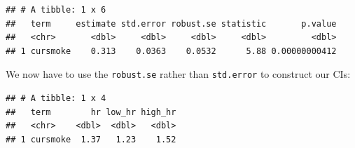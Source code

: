 \documentclass[
]{book}
\newenvironment{Shaded}{\begin{snugshade}}{\end{snugshade}}
\newcommand{\DataTypeTok}[1]{\textcolor[rgb]{0.13,0.29,0.53}{#1}}
\newcommand{\FloatTok}[1]{\textcolor[rgb]{0.00,0.00,0.81}{#1}}
\newcommand{\KeywordTok}[1]{\textcolor[rgb]{0.13,0.29,0.53}{\textbf{#1}}}
\newcommand{\NormalTok}[1]{#1}
\newcommand{\OperatorTok}[1]{\textcolor[rgb]{0.81,0.36,0.00}{\textbf{#1}}}
\newcommand{\StringTok}[1]{\textcolor[rgb]{0.31,0.60,0.02}{#1}}
\begin{document}
\begin{Shaded}
\end{Shaded}

\begin{verbatim}
## # A tibble: 1 x 6
##   term     estimate std.error robust.se statistic       p.value
##   <chr>       <dbl>     <dbl>     <dbl>     <dbl>         <dbl>
## 1 cursmoke    0.313    0.0363    0.0532      5.88 0.00000000412
\end{verbatim}

We now have to use the \texttt{robust.se} rather than \texttt{std.error} to construct our CIs:

\begin{Shaded}
\end{Shaded}

\begin{verbatim}
## # A tibble: 1 x 4
##   term        hr low_hr high_hr
##   <chr>    <dbl>  <dbl>   <dbl>
## 1 cursmoke  1.37   1.23    1.52
\end{verbatim}
\end{document}
